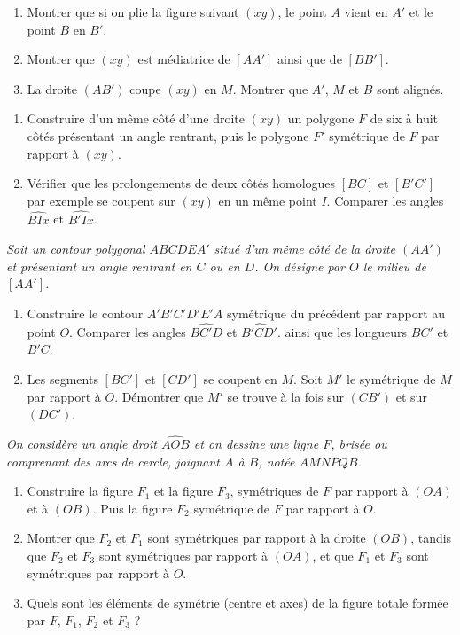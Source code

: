 \begin{itemize}
\begin{enumerate}
\item Montrer que si on plie la figure suivant $(xy)$, le point $A$ vient en $A'$ et le point $B$ en $B'$.
\item Montrer que $(xy)$ est médiatrice de $[AA']$ ainsi que de $[BB']$. 
\item La droite $(AB')$ coupe $(xy)$ en $M$. Montrer que $A'$, $M$ et $B$ sont alignés.
\end{enumerate}
\it \begin{enumerate}
\item Construire d'un même côté d'une droite $(xy)$ un polygone $F$ de six à huit côtés présentant un angle rentrant, puis le polygone $F'$ symétrique de $F$ par rapport à $(xy)$. 
\item Vérifier que les prolongements de deux côtés homologues $[BC]$ et $[B'C']$ par exemple se coupent sur $(xy)$ en un même point $I$. Comparer les angles $\widehat{BIx}$ et $\widehat{B'Ix}$.
\end{enumerate}
\it Soit un contour polygonal $ABCDEA'$ situé d'un même côté de la droite $(AA')$ et présentant un angle rentrant en $C$ ou en $D$. On désigne par $O$ le milieu de $[AA']$. \begin{enumerate}
\item Construire le contour $A'B'C'D'E'A$ symétrique du précédent par rapport au point $O$. Comparer les angles 
$\widehat{BC'D}$ et $\widehat{B'CD'}$. ainsi que les longueurs $BC'$ et $B'C$. 
\item Les segments $[BC']$ et $[CD']$ se coupent en $M$. Soit $M'$ le symétrique de $M$ par rapport à $O$. Démontrer que $M'$ se trouve à la fois sur $(CB')$ et sur $(DC')$. 
\end{enumerate}
\it On considère un angle droit $\widehat{AOB}$ et on dessine une ligne $F$, brisée ou comprenant des arcs de cercle, joignant $A$ à $B$, notée $AMNPQB$.\begin{enumerate}
\item Construire la figure $F_1$ et la figure $F_3$,
symétriques de $F$ par rapport à $(OA)$ et à $(OB)$.
Puis la figure $F_2$ symétrique de $F$ par rapport à $O$.
\item Montrer que $F_2$ et $F_1$ sont symétriques par rapport à la droite $(OB)$, tandis que $F_2$ et $F_3$ sont symétriques par rapport à $(OA)$, et que $F_1$ et $F_3$ sont symétriques par rapport à $O$. 
\item Quels sont les éléments de symétrie (centre et axes) de la figure totale formée par $F$, $F_1$, $F_2$ et $F_3$ ?
\end{enumerate}
\end{itemize}